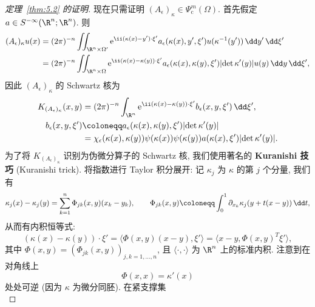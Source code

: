 \begin{proof}[定理~\ref{thm:5.2} 的证明]
现在只需证明 $(A_\epsilon)_\kappa \in \Psi_{\mathrm{c}}^m(\Omega)$. 首先假定 $a \in S^{-\infty}(\R^n; \R^n)$. 则
\begin{equation}\label{eq:5.7}
    \begin{aligned}
        (A_\epsilon)_\kappa u(x) &= (2\pi)^{-n} \iint_{\R^n \times \Omega'} \ee^{\ii (\kappa(x) - y') \cdot \xi'} a_\epsilon(\kappa(x), y', \xi') u(\kappa^{-1}(y')) \,\dd y' \,\dd\xi' \\
        &= (2\pi)^{-n} \iint_{\R^n \times \Omega} \ee^{\ii (\kappa(x) - \kappa(y)) \cdot \xi'} a_\epsilon(\kappa(x), \kappa(y), \xi') |\!\det \kappa'(y)| u(y) \,\dd y \,\dd\xi',
    \end{aligned}
\end{equation}
因此 $(A_\epsilon)_\kappa$ 的 Schwartz 核为
\begin{equation}\label{eq:5.8}
    \begin{aligned}
        K_{(A_\epsilon)_\kappa}(x, y) &= (2\pi)^{-n} \int_{\R^n} \ee^{\ii (\kappa(x) - \kappa(y)) \cdot \xi'} b_\epsilon(x, y, \xi') \,\dd\xi', \\
        b_\epsilon(x, y, \xi') &\defeq a_\epsilon(\kappa(x), \kappa(y), \xi') |\!\det \kappa'(y)| \\
        &= \chi_\epsilon(\kappa(x), \kappa(y)) \psi(\kappa(x)) \psi(\kappa(y)) a(\kappa(x), \xi') |\!\det \kappa'(y)|.
    \end{aligned}
\end{equation}
为了将 $K_{(A_\epsilon)_\kappa}$ 识别为伪微分算子的 Schwartz 核, 我们使用著名的 \textbf{Kuranishi 技巧} (Kuranishi trick). 将指数进行 Taylor 积分展开: 记 $\kappa_j$ 为 $\kappa$ 的第 $j$ 个分量, 我们有
\begin{equation}\label{eq:5.9}
    \kappa_j(x) - \kappa_j(y) = \sum_{k=1}^n \Phi_{jk}(x, y) (x_k - y_k), \qquad \Phi_{jk}(x, y) \defeq \int_0^1 \partial_{x_k} \kappa_j(y + t(x - y)) \,\dd t,
\end{equation}
从而有内积恒等式:
\begin{equation}\label{eq:5.10}
    (\kappa(x) - \kappa(y)) \cdot \xi' = \langle \Phi(x, y) (x - y), \xi' \rangle = \langle x - y, \Phi(x, y)^T \xi' \rangle,
\end{equation}
其中 $\Phi(x, y) = (\Phi_{jk}(x, y))_{j, k=1, \ldots, n}$, 且 $\langle \cdot, \cdot \rangle$ 为 $\R^n$ 上的标准内积. 注意到在对角线上
\begin{equation}\label{eq:5.11}
    \Phi(x, x) = \kappa'(x)
\end{equation}
处处可逆 (因为 $\kappa$ 为微分同胚). 在紧支撑集
\begin{equation}\label{eq:5.12}

\end{equation}
\end{proof}
